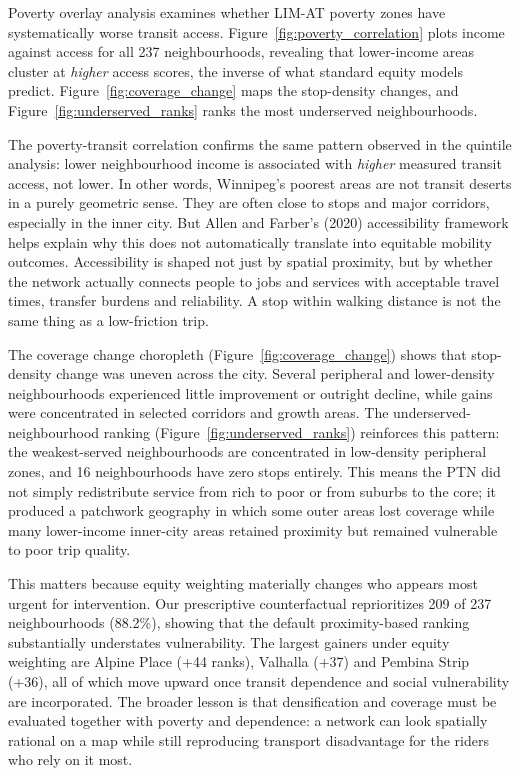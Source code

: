 \documentclass[11pt]{article}
\begin{document}
Poverty overlay analysis examines whether LIM-AT poverty zones have systematically worse transit access. Figure~\ref{fig:poverty_correlation} plots income against access for all 237 neighbourhoods, revealing that lower-income areas cluster at \emph{higher} access scores, the inverse of what standard equity models predict. Figure~\ref{fig:coverage_change} maps the stop-density changes, and Figure~\ref{fig:underserved_ranks} ranks the most underserved neighbourhoods.

The poverty-transit correlation confirms the same pattern observed in the quintile analysis: lower neighbourhood income is associated with \emph{higher} measured transit access, not lower. In other words, Winnipeg's poorest areas are not transit deserts in a purely geometric sense. They are often close to stops and major corridors, especially in the inner city. But Allen and Farber's (2020) accessibility framework helps explain why this does not automatically translate into equitable mobility outcomes. Accessibility is shaped not just by spatial proximity, but by whether the network actually connects people to jobs and services with acceptable travel times, transfer burdens and reliability. A stop within walking distance is not the same thing as a low-friction trip.

The coverage change choropleth (Figure~\ref{fig:coverage_change}) shows that stop-density change was uneven across the city. Several peripheral and lower-density neighbourhoods experienced little improvement or outright decline, while gains were concentrated in selected corridors and growth areas. The underserved-neighbourhood ranking (Figure~\ref{fig:underserved_ranks}) reinforces this pattern: the weakest-served neighbourhoods are concentrated in low-density peripheral zones, and 16 neighbourhoods have zero stops entirely. This means the PTN did not simply redistribute service from rich to poor or from suburbs to the core; it produced a patchwork geography in which some outer areas lost coverage while many lower-income inner-city areas retained proximity but remained vulnerable to poor trip quality.

This matters because equity weighting materially changes who appears most urgent for intervention. Our prescriptive counterfactual reprioritizes 209 of 237 neighbourhoods (88.2\%), showing that the default proximity-based ranking substantially understates vulnerability. The largest gainers under equity weighting are Alpine Place (+44 ranks), Valhalla (+37) and Pembina Strip (+36), all of which move upward once transit dependence and social vulnerability are incorporated. The broader lesson is that densification and coverage must be evaluated together with poverty and dependence: a network can look spatially rational on a map while still reproducing transport disadvantage for the riders who rely on it most.
\end{document}
